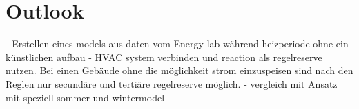 \section{Outlook}
\label{sec:outlook}
- Erstellen eines models aus daten vom Energy lab während heizperiode ohne ein künstlichen aufbau
- HVAC system verbinden und reaction als regelreserve nutzen. Bei einen Gebäude ohne die möglichkeit strom einzuspeisen sind nach den Reglen nur secundäre und tertiäre regelreserve möglich.
- vergleich mit Ansatz mit speziell sommer und wintermodel 

%

